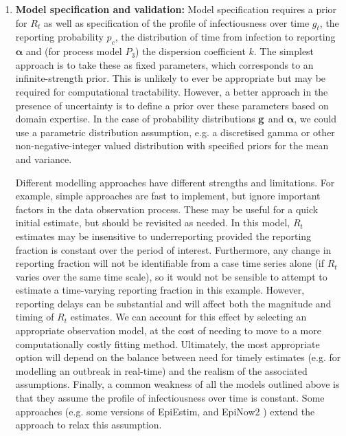 \documentclass{article}
\begin{document}
\begin{enumerate}
\item \textbf{Model specification and validation:} Model specification requires a prior for $R_t$ as well as specification of the profile of infectiousness over time $g_t$, the reporting probability $p_c$, the distribution of time from infection to reporting $\boldsymbol{\alpha}$ and (for process model $P_3$) the dispersion coefficient $k$. The simplest approach is to take these as fixed parameters, which corresponds to an infinite-strength prior. This is unlikely to ever be appropriate but may be required for computational tractability. However, a better approach in the presence of uncertainty is to define a prior over these parameters based on domain expertise. In the case of probability distributions ${\bf g}$ and $\boldsymbol{\alpha}$, we could use a parametric distribution assumption, e.g. a discretised gamma \citep{charniga2024best,park2024estimating} or other non-negative-integer valued distribution with specified priors for the mean and variance. 

Different modelling approaches have different strengths and limitations. For example, simple approaches are fast to implement, but ignore important factors in the data observation process. These may be useful for a quick initial estimate, but should be revisited as needed. In this model, $R_t$ estimates may be insensitive to underreporting provided the reporting fraction is constant over the period of interest. Furthermore, any change in reporting fraction will not be identifiable from a case time series alone (if $R_t$ varies over the same time scale), so it would not be sensible to attempt to estimate a time-varying reporting fraction in this example. However, reporting delays can be substantial and will affect both the magnitude and timing of $R_t$ estimates. We can account for this effect by selecting an appropriate observation model, at the cost of needing to move to a more computationally costly fitting method. Ultimately, the most appropriate option will depend on the balance between need for timely estimates (e.g. for modelling an outbreak in real-time) and the realism of the associated assumptions. 
Finally, a common weakness of all the models outlined above is that they assume the profile of infectiousness over time is constant. Some approaches (e.g. some versions of EpiEstim, and EpiNow2 \citep{abbott2020estimating}) extend the approach to relax this assumption.
 

\end{enumerate}
\end{document}
